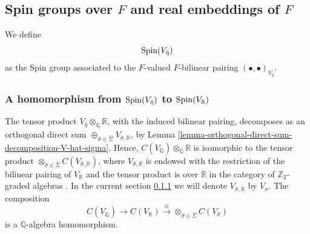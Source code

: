 \documentclass[12pt]{amsart}
\numberwithin{equation}{subsection}
\theoremstyle{plain}
\theoremstyle{definition}
\newtheorem{rem}[thm]{Remark}
\newcommand{\QQ}{{\mathbb Q}}
\newcommand{\RR}{{\mathbb R}}
\newcommand{\ZZ}{{\mathbb Z}}
\newcommand{\Spin}{{\rm Spin}}
\newcommand{\IsomRightArrow}{\stackrel{\cong}{\rightarrow}}
\begin{document}
{%
%
\subsection{Spin groups over $F$ and real embeddings of $F$}
We define 
\[
\Spin(V_{\hat{\eta}})
\] 
as the Spin group associated to the $F$-valued $F$-bilinear pairing $(\bullet,\bullet)_{V_{\hat{\eta}}}$.

%
\subsubsection{A homomorphism from $\Spin(V_{\hat{\eta}})$ to $\Spin(V_\RR)$}
\label{sec-homomorphism-from-Spein-V-hat-eta-to-Spin-V-RR}

The tensor product $V_{\hat{\eta}}\otimes_\QQ\RR$, with the induced bilinear pairing, decomposes as an orthogonal direct sum $\oplus_{\hat{\sigma}\in \hat{\Sigma}}V_{\hat{\sigma},\RR}$, by Lemma \ref{lemma-orthogonal-direct-sum-decomposition-V-hat-sigma}. Hence, $C(V_\QQ)\otimes_\QQ\RR$ is isomorphic to the tensor product 
$\otimes_{\hat{\sigma}\in\hat{\Sigma}}C(V_{\hat{\sigma},\RR})$, where $V_{\hat{\sigma},\RR}$ is endowed with the restriction of the bilinear pairing of $V_\RR$ and
 the tensor product is over $\RR$ in the category of $\ZZ_2$-graded algebras \cite[Lemma V.1.7]{lam}.
 In the current section \ref{sec-homomorphism-from-Spein-V-hat-eta-to-Spin-V-RR} we will denote $V_{\hat{\sigma},\RR}$ by $V_{\hat{\sigma}}$.
The composition
\[
C(V_\QQ)\rightarrow C(V_\RR)\IsomRightArrow \otimes_{\hat{\sigma}\in\hat{\Sigma}}C(V_{\hat{\sigma}})
\]
is a $\QQ$-algebra homomorphism. 


}
\end{document}
